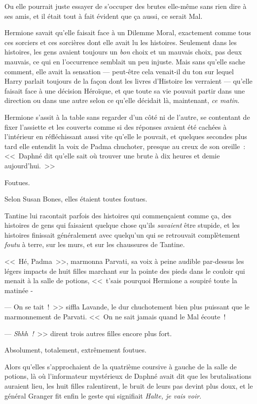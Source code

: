 Ou elle pourrait juste essayer de s'occuper des brutes elle-même sans rien dire à ses amis, et il était tout à fait évident que ça aussi, ce serait Mal.

Hermione savait qu'elle faisait face à un Dilemme Moral, exactement comme tous ces sorciers et ces sorcières dont elle avait lu les histoires. Seulement dans les histoires, les gens avaient toujours un \emph{bon} choix et un mauvais choix, pas deux mauvais, ce qui en l'occurrence semblait un peu injuste. Mais sans qu'elle sache comment, elle avait la sensation — peut-être cela venait-il du ton sur lequel Harry parlait toujours de la façon dont les livres d'Histoire les verraient — qu'elle faisait face à une décision Héroïque, et que toute sa vie pouvait partir dans une direction ou dans une autre selon ce qu'elle décidait là, maintenant, \emph{ce matin}.

Hermione s'assit à la table sans regarder d'un côté ni de l'autre, se contentant de fixer l'assiette et les couverts comme si des réponses avaient été cachées à l'intérieur en réfléchissant aussi vite qu'elle le pouvait, et quelques secondes plus tard elle entendit la voix de Padma chuchoter, presque au creux de son oreille~: <<~Daphné dit qu'elle sait où trouver une brute à dix heures et demie aujourd'hui.~>>

\later

Foutues.

Selon Susan Bones, elles étaient toutes foutues.

Tantine lui racontait parfois des histoires qui commençaient comme ça, des histoires de gens qui faisaient quelque chose qu'ils \emph{savaient} être stupide, et les histoires finissait généralement avec quelqu'un qui se retrouvait complètement \emph{foutu} à terre, sur les murs, et sur les chaussures de Tantine.

<<~Hé, Padma~>>, marmonna Parvati, sa voix à peine audible par-dessus les légers impacts de huit filles marchant sur la pointe des pieds dans le couloir qui menait à la salle de potions, <<~t'sais pourquoi Hermione a soupiré toute la matinée -

--- On se tait~!~>> siffla Lavande, le dur chuchotement bien plus puissant que le marmonnement de Parvati. <<~On ne sait jamais quand le Mal écoute~!

--- \emph{Shhh~!}~>> dirent trois autres filles encore plus fort.

Absolument, totalement, extrêmement foutues.

Alors qu'elles s'approchaient de la quatrième coursive à gauche de la salle de potions, là où l'informateur mystérieux de Daphné avait dit que les brutalisations auraient lieu, les huit filles ralentirent, le bruit de leurs pas devint plus doux, et le général Granger fit enfin le geste qui signifiait \emph{Halte, je vais voir}.

